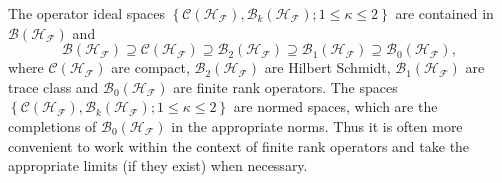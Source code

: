 \documentclass[aps,preprint]{revtex4}%
\begin{document}
The operator ideal spaces $\left\{  \mathcal{C}\left(  \mathcal{H}%
_{\mathcal{F}}\right)  ,\mathcal{B}_{k}\left(  \mathcal{H}_{\mathcal{F}%
}\right)  ;1\leq\kappa\leq2\right\}  $ are contained in $\mathcal{B}\left(
\mathcal{H}_{\mathcal{F}}\right)  $ and
\begin{equation}
\mathcal{B}\left(  \mathcal{H}_{\mathcal{F}}\right)  \supseteq\mathcal{C}%
\left(  \mathcal{H}_{\mathcal{F}}\right)  \supseteq\mathcal{B}_{2}\left(
\mathcal{H}_{\mathcal{F}}\right)  \supseteq\mathcal{B}_{1}\left(
\mathcal{H}_{\mathcal{F}}\right)  \supseteq\mathcal{B}_{0}\left(
\mathcal{H}_{\mathcal{F}}\right)  ,
\end{equation}
where $\mathcal{C}\left(  \mathcal{H}_{\mathcal{F}}\right)  $ are compact,
$\mathcal{B}_{2}\left(  \mathcal{H}_{\mathcal{F}}\right)  $ are Hilbert
Schmidt, $\mathcal{B}_{1}\left(  \mathcal{H}_{\mathcal{F}}\right)  $ are trace
class and $\mathcal{B}_{0}\left(  \mathcal{H}_{\mathcal{F}}\right)  $ are
finite rank operators. The spaces $\left\{  \mathcal{C}\left(  \mathcal{H}%
_{\mathcal{F}}\right)  ,\mathcal{B}_{k}\left(  \mathcal{H}_{\mathcal{F}%
}\right)  ;1\leq\kappa\leq2\right\}  $ are normed spaces, which are the
completions of $\mathcal{B}_{0}\left(  \mathcal{H}_{\mathcal{F}}\right)  $ in
the appropriate norms. Thus it is often more convenient to work within the
context of finite rank operators and take the appropriate limits (if they
exist) when necessary.
\end{document}
